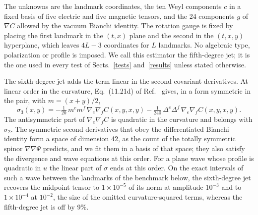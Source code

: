\documentclass[11pt,a4paper]{article}
\begin{document}
The unknowns are the landmark coordinates, the ten Weyl components $c$ in a
fixed basis of five electric and five magnetic tensors, and the 24
components $g$ of $\nabla C$ allowed by the vacuum Bianchi identity. The
rotation gauge is fixed by placing the first landmark in the $(t,x)$ plane
and the second in the $(t,x,y)$ hyperplane, which leaves $4L-3$ coordinates
for $L$ landmarks. No algebraic type, polarization or profile is imposed. We
call this estimator the fifth-degree jet; it is the one used in every test
of Sects.~\ref{tests} and~\ref{results} unless stated otherwise.

The sixth-degree jet adds the term linear in the second covariant
derivatives. At linear order in the curvature, Eq.~(11.21d) of
Ref.~\cite{brewin} gives, in a form symmetric in the pair, with
$m=(x+y)/2$,
\begin{equation}
 \sigma_3(x,y)=-\tfrac1{20}\,m^em^f\,\nabla_e\nabla_fC(x,y,x,y)
 -\tfrac1{240}\,\Delta^e\Delta^f\,\nabla_e\nabla_fC(x,y,x,y). \label{sixth}
\end{equation}
The antisymmetric part of $\nabla_e\nabla_f C$ is quadratic in the curvature
and belongs with $\sigma_2$. The symmetric second derivatives that obey the
differentiated Bianchi identity form a space of dimension 42, as the count
of the totally symmetric spinor $\nabla\nabla\Psi$ predicts, and we fit them
in a basis of that space; they also satisfy the divergence and wave
equations at this order. For a plane wave whose profile is quadratic in $u$
the linear part of $\sigma$ ends at this order. On the exact intervals of
such a wave between the landmarks of the benchmark below, the sixth-degree
jet recovers the midpoint tensor to $1\times10^{-5}$ of its norm at
amplitude $10^{-3}$ and to $1\times10^{-4}$ at $10^{-2}$, the size of the
omitted curvature-squared terms, whereas the fifth-degree jet is off by 9\%.
\end{document}
